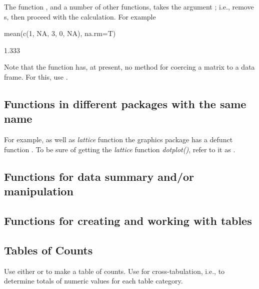 The function , and a number of other functions, takes the
argument ; i.e., remove s, then proceed with
the calculation. For example
\begin{Schunk}
\begin{Sinput}
mean(c(1, NA, 3, 0, NA), na.rm=T)
\end{Sinput}
\begin{Soutput}
[1] 1.333
\end{Soutput}
\end{Schunk}

Note that the function  has, at present, no method for
coercing a matrix to a data frame. For this, use
.

\subsection*{Functions in different packages with the same name}
For example, as well as {\em lattice} function 
the graphics package has a defunct function .
To be sure of getting the {\em lattice} function {\em dotplot()},
refer to it as .


\subsection{Functions for data summary and/or manipulation}

\subsection{Functions for creating and working with tables}\label{sec:tab}

\subsection{Tables of Counts}

Use either  or  to make a table of
counts. Use  for cross-tabulation, i.e., to determine
totals of numeric values for each table category.

